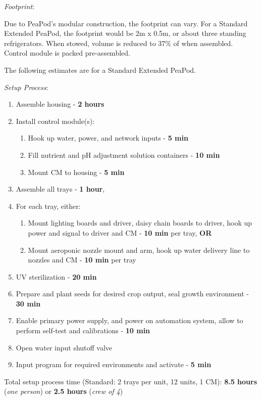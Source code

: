 \textit{Footprint}:

Due to PeaPod's modular construction, the footprint can vary. For a Standard Extended PeaPod, the footprint would be 2m x 0.5m, or about three standing refrigerators. When stowed, volume is reduced to 37\% of when assembled. Control module is packed pre-assembled.

The following estimates are for a Standard Extended PeaPod.

\textit{Setup Process}:

\begin{enumerate}
    \item Assemble housing - \textbf{2 hours}
    \item Install control module(s):
    \begin{enumerate}
        \item Hook up water, power, and network inputs - \textbf{5 min}
        \item Fill nutrient and pH adjustment solution containers - \textbf{10 min}
        \item Mount CM to housing - \textbf{5 min}
    \end{enumerate}
    \item Assemble all trays - \textbf{1 hour},
    \item For each tray, either:
    \begin{enumerate}
        \item Mount lighting boards and driver, daisy chain boards to driver, hook up power and signal to driver and CM - \textbf{10 min} per tray, \textbf{OR}
        \item Mount aeroponic nozzle mount and arm, hook up water delivery line to nozzles and CM - \textbf{10 min} per tray
    \end{enumerate}
    \item UV sterilization - \textbf{20 min}
    \item Prepare and plant seeds for desired crop output, seal growth environment - \textbf{30 min}
    \item Enable primary power supply, and power on automation system, allow to perform self-test and calibrations - \textbf{10 min}
    \item Open water input shutoff valve
    \item Input program for required environments and activate - \textbf{5 min}
\end{enumerate}

Total setup process time (Standard: 2 trays per unit, 12 units, 1 CM): \textbf{8.5 hours} (\textit{one person}) or \textbf{2.5 hours} (\textit{crew of 4})

